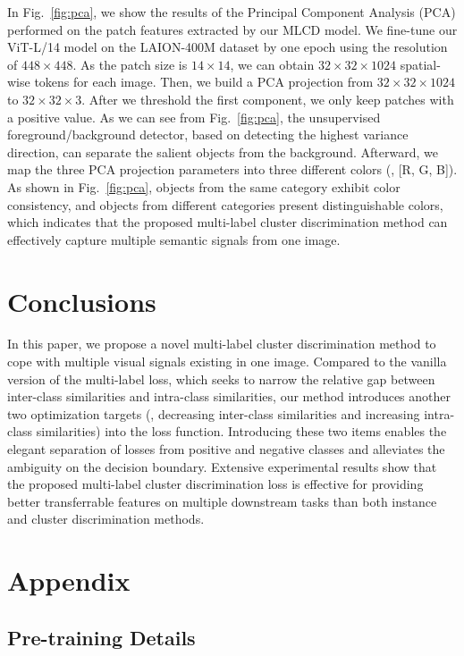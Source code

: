   In Fig.~\ref{fig:pca}, we show the results of the Principal Component Analysis (PCA) performed on the patch features extracted by our MLCD model. We fine-tune our ViT-L/14 model on the LAION-400M dataset by one epoch using the resolution of $448\times448$. As the patch size is $14\times14$, we can obtain $32\times32\times1024$ spatial-wise tokens for each image. Then, we build a PCA projection from $32\times32\times1024$ to $32\times32\times3$. After we threshold
the first component, we only keep patches with a positive value. 
As we can see from Fig.~\ref{fig:pca}, the unsupervised foreground/background detector, based on detecting the
highest variance direction, can separate the salient objects from the background. Afterward, we map the three PCA projection parameters into three different colors (\ie, [R, G, B]). 
As shown in Fig.~\ref{fig:pca}, objects from the same category exhibit color consistency, and objects from different categories present distinguishable colors, which indicates that the proposed multi-label cluster discrimination method can effectively capture multiple semantic signals from one image.

\section{Conclusions}
In this paper, we propose a novel multi-label cluster discrimination method to cope with multiple visual signals existing in one image. Compared to the vanilla version of the multi-label loss, which seeks to narrow the relative gap between inter-class similarities and intra-class similarities, our method introduces another two
optimization targets (\ie, decreasing inter-class similarities and increasing intra-class similarities) into the loss function. Introducing these two items enables the elegant separation of losses from positive and negative classes and alleviates the ambiguity on the decision boundary.
Extensive experimental results show that the proposed multi-label cluster discrimination loss is effective for providing better transferrable features on multiple downstream tasks than both instance and cluster discrimination methods.

\newpage
\appendix
\section{Appendix}

\subsection{Pre-training Details}

